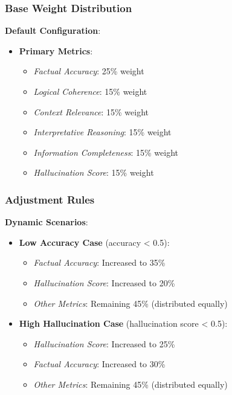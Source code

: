 \vspace{0.5em}
\subsubsection{Base Weight Distribution}
\textbf{Default Configuration}:
\begin{itemize}
    \item \textbf{Primary Metrics}:
    \begin{itemize}
        \item \textit{Factual Accuracy}: 25\% weight
        \item \textit{Logical Coherence}: 15\% weight
        \item \textit{Context Relevance}: 15\% weight
        \item \textit{Interpretative Reasoning}: 15\% weight
        \item \textit{Information Completeness}: 15\% weight
        \item \textit{Hallucination Score}: 15\% weight
    \end{itemize}
\end{itemize}

\vspace{0.5em}
\subsubsection{Adjustment Rules}
\textbf{Dynamic Scenarios}:
\begin{itemize}
    \item \textbf{Low Accuracy Case} (accuracy < 0.5):
    \begin{itemize}
        \item \textit{Factual Accuracy}: Increased to 35\%
        \item \textit{Hallucination Score}: Increased to 20\%
        \item \textit{Other Metrics}: Remaining 45\% (distributed equally)
    \end{itemize}
    
    \item \textbf{High Hallucination Case} (hallucination score < 0.5):
    \begin{itemize}
        \item \textit{Hallucination Score}: Increased to 25\%
        \item \textit{Factual Accuracy}: Increased to 30\%
        \item \textit{Other Metrics}: Remaining 45\% (distributed equally)
    \end{itemize}
\end{itemize}


